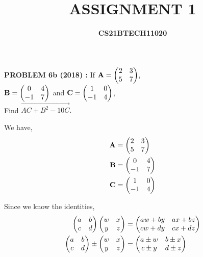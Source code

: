 \documentclass[journal,12pt,twocolumn]{IEEEtran}
\begin{document}

\title{\textbf{ASSIGNMENT 1}}
\author{\textbf{CS21BTECH11020}}
\date{}

\setlength{\parskip}{0.8em}


  \maketitle
  
  \textbf{PROBLEM 6b (2018) :} 
      If $\mathbf{A}=\begin{pmatrix}
        2 & 3 \\
        5 & 7 \\
      \end{pmatrix}$,\\
       $\mathbf{B}=\begin{pmatrix} 
        0 & 4 \\
       -1 & 7 \\
      \end{pmatrix}$ and $\mathbf{C} =\begin{pmatrix} 
        1 & 0 \\
        -1 & 4 \\
       \end{pmatrix}$, \vspace*{12pt}
       \\Find $\vec{AC+B^2-10C}.$


  \solution We have,
    \begin{align}  
     \mathbf{A}&= \begin{pmatrix}
      2 & 3 \\
      5 & 7 \\
     \end{pmatrix}\\ 
     \mathbf{B}&=\begin{pmatrix} 
      0 & 4 \\
      -1 & 7 \\
      \end{pmatrix}\\
     \mathbf{C}&= \begin{pmatrix}
      1 & 0 \\
      -1 & 4 \\
      \end{pmatrix}
    \end{align}

    Since we know the identities,
    \begin{align}
     \begin{pmatrix} 
        a & b \\
        c & d \\
      \end{pmatrix} 
     \begin{pmatrix} 
        w & x \\
        y & z \\
      \end{pmatrix} 
      &=
     \begin{pmatrix} 
        aw+by & ax+bz \\
        cw+dy & cx+dz \\
      \end{pmatrix} 
    \\
     \begin{pmatrix} 
        a & b \\
        c & d
      \end{pmatrix} 
      \pm
     \begin{pmatrix} 
        w & x \\
        y & z
      \end{pmatrix} 
      &=
     \begin{pmatrix} 
        a\pm w & b\pm x \\
        c\pm y & d\pm z
      \end{pmatrix} 
    \end{align}
    
\end{document}
